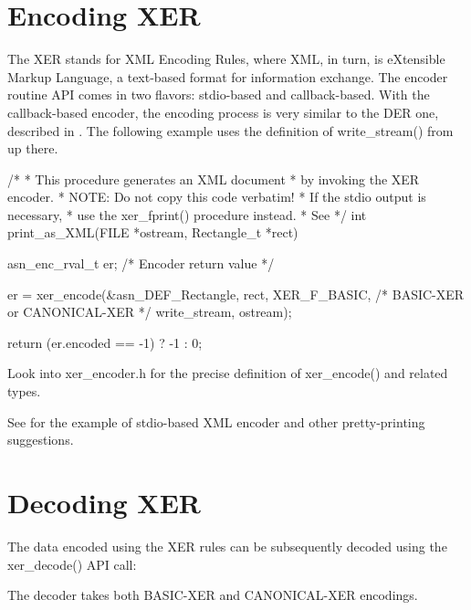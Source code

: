 \documentclass[english,oneside,12pt]{book}
\begin{document}
\section{\label{sec:Encoding-XER}Encoding XER}

The XER stands for XML Encoding Rules, where XML, in turn, is eXtensible
Markup Language, a text-based format for information exchange. The
encoder routine API comes in two flavors: stdio-based and callback-based.
With the callback-based encoder, the encoding process is very similar
to the DER one, described in . The
following example uses the definition of write\_stream() from up there.
\begin{codesample}
/*
 * This procedure generates an XML document
 * by invoking the XER encoder.
 * NOTE: Do not copy this code verbatim!
 *       If the stdio output is necessary,
 *       use the xer_fprint() procedure instead.
 *       See %
 */
int
print_as_XML(FILE *ostream, Rectangle_t *rect) {
    asn_enc_rval_t er;  /* Encoder return value */

    er = xer_encode(&asn_DEF_Rectangle, rect,
        XER_F_BASIC, /* BASIC-XER or CANONICAL-XER */
        write_stream, ostream);

    return (er.encoded == -1) ? -1 : 0;
}
\end{codesample}
Look into xer\_encoder.h for the precise definition of xer\_encode()
and related types.

See  for the example of stdio-based
XML encoder and other pretty-printing suggestions.


\section{\label{sec:Decoding-XER}Decoding XER}

The data encoded using the XER rules can be subsequently decoded using
the xer\_decode() API call:
The decoder takes both BASIC-XER and CANONICAL-XER encodings.
\end{document}
